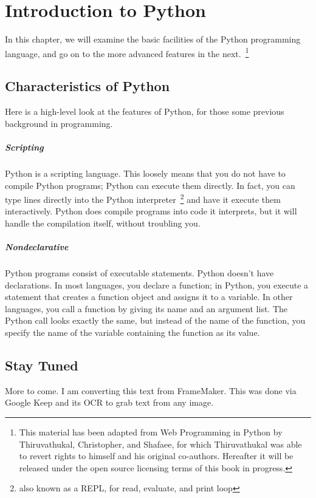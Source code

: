 \chapter{Introduction to Python}


In this chapter, we will examine the basic facilities of the Python programming language, and go on to the more advanced features in the next.~\footnote{This material has been adapted from Web Programming in Python by Thiruvathukal, Christopher, and Shafaee, for which Thiruvathukal was able to revert rights to himself and his original co-authors. Hereafter it will be released under the open source licensing terms of this book in progress.}

\section{Characteristics of Python}

Here is a high-level look at the features of Python, for those some previous background in programming.

\paragraph{Scripting}
Python is a scripting language. This loosely means that you
do not have to compile Python programs; Python can execute them
directly. In fact, you can type lines directly into the Python interpreter~\footnote{also known as a REPL, for read, evaluate, and print loop}
and have it execute them interactively. Python does compile programs
into code it interprets, but it will handle the compilation itself, without
troubling you.

\paragraph{Nondeclarative}
Python programs consist of executable statements.
Python doesn't have declarations. In most languages, you declare a function;
in Python, you execute a statement that creates a function object
and assigns it to a variable. In other languages, you call a function by
giving its name and an argument list. The Python call looks exactly the
same, but instead of the name of the function, you specify the name of
the variable containing the function as its value.

\section{Stay Tuned}

More to come. I am converting this text from FrameMaker. This was done via Google Keep and its OCR to grab text from any image.

